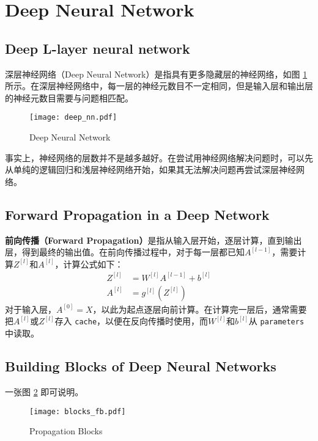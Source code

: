 \section{Deep Neural Network}

\subsection{Deep L-layer neural network}
深层神经网络（Deep Neural Network）是指具有更多隐藏层的神经网络，如图 \ref{fig:deep_nn} 所示。在深层神经网络中，每一层的神经元数目不一定相同，但是输入层和输出层的神经元数目需要与问题相匹配。
\begin{figure}[h!bt]
    \centering
    \texttt{[image: deep\_nn.pdf]}
    \caption[Deep Neural Network]{Deep Neural Network\setcounter{footnote}{0}\footnotemark}
    \label{fig:deep_nn}
\end{figure}

事实上，神经网络的层数并不是越多越好。在尝试用神经网络解决问题时，可以先从单纯的逻辑回归和浅层神经网络开始，如果其无法解决问题再尝试深层神经网络。

\subsection{Forward Propagation in a Deep Network}
\textbf{前向传播（Forward Propagation）}是指从输入层开始，逐层计算，直到输出层，得到最终的输出值。在前向传播过程中，对于每一层都已知$A^{[l-1]}$，需要计算$Z^{[l]}$和$A^{[l]}$，计算公式如下：
\begin{align}
    Z^{[l]} &= W^{[l]} A^{[l-1]} + b^{[l]} \\
    A^{[l]} &= g^{[l]}(Z^{[l]})
\end{align}
对于输入层，$A^{[0]} = X$，以此为起点逐层向前计算。在计算完一层后，通常需要把$A^{[l]}$或$Z^{[l]}$存入 \verb|cache|，以便在反向传播时使用，而$W^{[l]}$和$b^{[l]}$从 \verb|parameters| 中读取。

\subsection{Building Blocks of Deep Neural Networks}
一张图 \ref{fig:blocks_fb} 即可说明。
\begin{figure}[htb!]
    \centering
    \texttt{[image: blocks\_fb.pdf]}
    \caption{Propagation Blocks}
    \label{fig:blocks_fb}
\end{figure}

